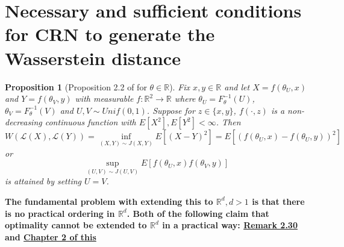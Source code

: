 \documentclass{article}
\theoremstyle{plain}%
\newtheorem{prop}[theorem]{Proposition}
\theoremstyle{definition}
\theoremstyle{remark}
\begin{document}
	\newpage
	\section{Necessary and sufficient conditions for CRN to generate the Wasserstein distance}
	\begin{prop}[Proposition 2.2 of \cite{crn} for $\theta \in \mathbb{R}$]\label{prop2}
		Fix $x, y \in \mathbb{R}$ and let $X=f(\theta_U,x)$ and $Y=f(\theta_V,y)$ with measurable $f : \mathbb{R}^2 \to \mathbb{R}$ where  $\theta_U = F^{-1}_{\theta}(U)$, $\theta_V = F^{-1}_{\theta}(V)$ and $U,V\sim Unif(0,1)$.
		Suppose for $z \in \{x,y\}$, $f(\cdot, z)$ is a non-decreasing continuous function with $E[X^2], E[Y^2] < \infty$. 
		Then
		\begin{equation}
			W(\mathcal{L}(X), \mathcal{L}(Y)) = \inf_{(X, Y) \sim J (X,Y)}E[(X-Y)^2]=E[(f(\theta_U,x)- f(\theta_U,y))^2]
		\end{equation}
		or
		\begin{equation}
			\sup_{(U, V) \sim J(U,V)} E[f(\theta_U,x)f(\theta_V,y)]
		\end{equation}
		is attained by setting $U = V$. 
	\end{prop}
	
	\textbf{The fundamental problem with extending this to $\mathbb{R}^d, d>1$ is that there is no practical ordering in $\mathbb{R}^d$. Both of the following claim that optimality cannot be extended to $\mathbb{R}^d$ in a practical way: \href{https://arxiv.org/pdf/1803.00567}{Remark 2.30} and \href{https://link.springer.com/book/10.1007/978-3-319-20828-2}{Chapter 2 of this}}
	
\end{document}
